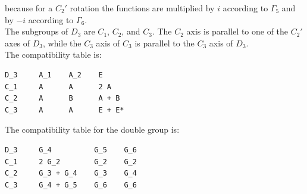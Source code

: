 \documentclass[12pt,a4paper]{article}
\begin{document}
because for a $C_2'$ rotation the functions are multiplied by $i$ according to
$\Gamma_5$ and by $-i$ according to $\Gamma_6$. \\
The subgroups of $D_3$ are $C_1$, $C_2$, and $C_3$. The $C_2$ axis is 
parallel to one of the $C_2'$ axes of $D_3$, while the $C_3$ axis 
of $C_3$ is parallel to the $C_3$ axis of $D_3$. \\
The compatibility table is:
\begin{verbatim}
D_3     A_1    A_2    E    
C_1     A      A      2 A      
C_2     A      B      A + B        
C_3     A      A      E + E*      
\end{verbatim}
The compatibility table for the double group is:
\begin{verbatim}
D_3     G_4          G_5    G_6    
C_1     2 G_2        G_2    G_2
C_2     G_3 + G_4    G_3    G_4
C_3     G_4 + G_5    G_6    G_6   
\end{verbatim}
\end{document}
